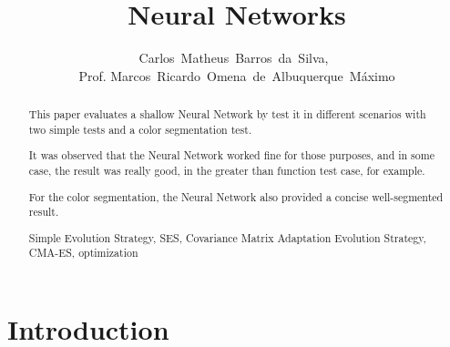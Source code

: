 \documentclass[journal]{IEEEtran}
\begin{document}
    \title{Neural Networks}
  \author{Carlos~Matheus~Barros~da~Silva,~\\Prof. Marcos~Ricardo~Omena~de~Albuquerque~Máximo}


\maketitle



\begin{abstract}

This paper evaluates a shallow Neural Network by test it in different scenarios with two simple tests and a color segmentation test.

It was observed that the Neural Network worked fine for those purposes, and in some case, the result was really good, in the greater than function test case, for example.

For the color segmentation, the Neural Network also provided a concise well-segmented result.

\begin{IEEEkeywords}
    Simple Evolution Strategy, SES, Covariance Matrix Adaptation Evolution Strategy, CMA-ES, optimization
\end{IEEEkeywords}
\end{abstract}

\IEEEpeerreviewmaketitle



\section{Introduction}
\end{document}
